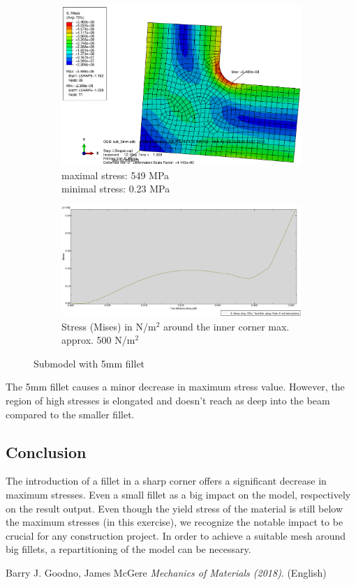 \documentclass[12pt]{article}
\begin{document}
\begin{figure}[!htb]
  \centering
  \begin{subfigure}{.5\textwidth}
    \centering
    \includegraphics[width=0.95\linewidth]{pics/CPS8R_Fillet_Plot_Circle_Plot_5mm}
    \caption{maximal stress: 549 MPa \\\hspace{\textwidth}minimal stress: 0.23 MPa}
  \end{subfigure}%
  \begin{subfigure}{.5\textwidth}
    \centering
    \includegraphics[width=0.95\linewidth]{pics/CPS8R_Fillet_Plot_Circle_Plot_5mm_plot}
    \caption{Stress (Mises) in N/m$^{2}$ around the inner corner max. approx. 500 N/m$^{2}$}
   \end{subfigure}
  \caption{Submodel with 5mm fillet}
\end{figure}

The 5mm fillet causes a minor decrease in maximum stress value. However, the region 
of high stresses is elongated and doesn't reach as deep into the beam compared to the smaller fillet.
\subsection{Conclusion}
The introduction of a fillet in a sharp corner offers a significant decrease in maximum stresses. Even a 
small fillet as a big impact on the model, respectively on the result output. Even though the yield stress 
of the material is still below the maximum stresses (in this exercise), we recognize the notable impact to 
be crucial for any construction project. In order to achieve a suitable mesh around big fillets, a 
repartitioning of the model can be necessary. 

\pagebreak
\begin{thebibliography}{9}
  Barry J. Goodno, James McGere
  \textit{Mechanics of Materials (2018)}. (English)  
\end{thebibliography}
\end{document}
